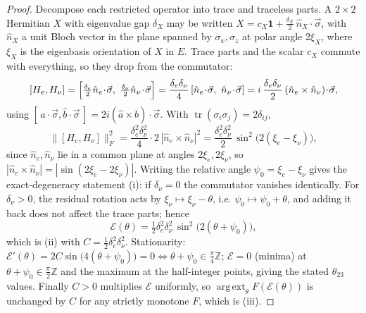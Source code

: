 \begin{proof}
Decompose each restricted operator into trace and traceless parts. A $2\times2$
Hermitian $X$ with eigenvalue gap $\delta_X$ may be written
$X=c_X\mathbf 1+\tfrac{\delta_X}{2}\,\hat n_X\!\cdot\!\vec\sigma$, with
$\hat n_X$ a unit Bloch vector in the plane spanned by $\sigma_x,\sigma_z$ at
polar angle $2\xi_X$, where $\xi_X$ is the eigenbasis orientation of $X$ in $E$.
Trace parts and the scalar $c_X$ commute with everything, so they drop from the
commutator:
\[
  [H_e,H_\nu]=\Bigl[\tfrac{\delta_e}{2}\hat n_e\!\cdot\!\vec\sigma,\
  \tfrac{\delta_\nu}{2}\hat n_\nu\!\cdot\!\vec\sigma\Bigr]
  =\frac{\delta_e\delta_\nu}{4}\,[\hat n_e\!\cdot\!\vec\sigma,\ \hat n_\nu\!\cdot\!\vec\sigma]
  = i\,\frac{\delta_e\delta_\nu}{2}\,(\hat n_e\times\hat n_\nu)\!\cdot\!\vec\sigma,
\]
using $[\,\hat a\!\cdot\!\vec\sigma,\hat b\!\cdot\!\vec\sigma\,]=2i(\hat a\times\hat b)\!\cdot\!\vec\sigma$.
With $\operatorname{tr}(\sigma_i\sigma_j)=2\delta_{ij}$,
\[
  \|[H_e,H_\nu]\|_F^2=\frac{\delta_e^2\delta_\nu^2}{4}\cdot 2\,|\hat n_e\times\hat n_\nu|^2
  =\frac{\delta_e^2\delta_\nu^2}{2}\,\sin^2\!\bigl(2(\xi_e-\xi_\nu)\bigr),
\]
since $\hat n_e,\hat n_\nu$ lie in a common plane at angles $2\xi_e,2\xi_\nu$, so
$|\hat n_e\times\hat n_\nu|=|\sin(2\xi_e-2\xi_\nu)|$. Writing the relative angle
$\psi_0=\xi_e-\xi_\nu$ gives the exact-degeneracy statement (i): if
$\delta_\nu=0$ the commutator vanishes identically. For $\delta_\nu>0$, the
residual rotation acts by $\xi_\nu\mapsto\xi_\nu-\theta$, i.e.
$\psi_0\mapsto\psi_0+\theta$, and adding it back does not affect the trace parts;
hence
\[
  \mathcal E(\theta)=\tfrac12\delta_e^2\delta_\nu^2\,\sin^2\!\bigl(2(\theta+\psi_0)\bigr),
\]
which is (ii) with $C=\tfrac12\delta_e^2\delta_\nu^2$. Stationarity:
$\mathcal E'(\theta)=2C\sin\!\bigl(4(\theta+\psi_0)\bigr)=0\iff\theta+\psi_0\in\tfrac{\pi}{4}\mathbb Z$;
$\mathcal E=0$ (minima) at $\theta+\psi_0\in\tfrac{\pi}{2}\mathbb Z$ and the
maximum at the half-integer points, giving the stated $\theta_{23}$ values.
Finally $C>0$ multiplies $\mathcal E$ uniformly, so $\operatorname*{arg\,ext}_\theta F(\mathcal E(\theta))$
is unchanged by $C$ for any strictly monotone $F$, which is (iii).
\end{proof}

